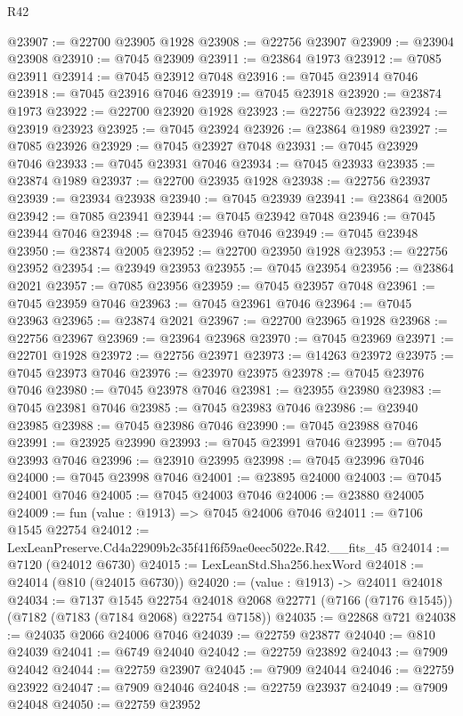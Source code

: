 \begin{lexlean}{R42}
\begin{coremodule}
{@23907 := @22700 @23905 @1928
@23908 := @22756 @23907
@23909 := @23904 @23908
@23910 := @7045 @23909
@23911 := @23864 @1973
@23912 := @7085 @23911
@23914 := @7045 @23912 @7048
@23916 := @7045 @23914 @7046
@23918 := @7045 @23916 @7046
@23919 := @7045 @23918
@23920 := @23874 @1973
@23922 := @22700 @23920 @1928
@23923 := @22756 @23922
@23924 := @23919 @23923
@23925 := @7045 @23924
@23926 := @23864 @1989
@23927 := @7085 @23926
@23929 := @7045 @23927 @7048
@23931 := @7045 @23929 @7046
@23933 := @7045 @23931 @7046
@23934 := @7045 @23933
@23935 := @23874 @1989
@23937 := @22700 @23935 @1928
@23938 := @22756 @23937
@23939 := @23934 @23938
@23940 := @7045 @23939
@23941 := @23864 @2005
@23942 := @7085 @23941
@23944 := @7045 @23942 @7048
@23946 := @7045 @23944 @7046
@23948 := @7045 @23946 @7046
@23949 := @7045 @23948
@23950 := @23874 @2005
@23952 := @22700 @23950 @1928
@23953 := @22756 @23952
@23954 := @23949 @23953
@23955 := @7045 @23954
@23956 := @23864 @2021
@23957 := @7085 @23956
@23959 := @7045 @23957 @7048
@23961 := @7045 @23959 @7046
@23963 := @7045 @23961 @7046
@23964 := @7045 @23963
@23965 := @23874 @2021
@23967 := @22700 @23965 @1928
@23968 := @22756 @23967
@23969 := @23964 @23968
@23970 := @7045 @23969
@23971 := @22701 @1928
@23972 := @22756 @23971
@23973 := @14263 @23972
@23975 := @7045 @23973 @7046
@23976 := @23970 @23975
@23978 := @7045 @23976 @7046
@23980 := @7045 @23978 @7046
@23981 := @23955 @23980
@23983 := @7045 @23981 @7046
@23985 := @7045 @23983 @7046
@23986 := @23940 @23985
@23988 := @7045 @23986 @7046
@23990 := @7045 @23988 @7046
@23991 := @23925 @23990
@23993 := @7045 @23991 @7046
@23995 := @7045 @23993 @7046
@23996 := @23910 @23995
@23998 := @7045 @23996 @7046
@24000 := @7045 @23998 @7046
@24001 := @23895 @24000
@24003 := @7045 @24001 @7046
@24005 := @7045 @24003 @7046
@24006 := @23880 @24005
@24009 := fun (value : @1913) => @7045 @24006 @7046
@24011 := @7106 @1545 @22754
@24012 := LexLeanPreserve.Cd4a22909b2c35f41f6f59ae0eec5022e.R42.__fits_45
@24014 := @7120 (@24012 @6730)
@24015 := LexLeanStd.Sha256.hexWord
@24018 := @24014 (@810 (@24015 @6730))
@24020 := (value : @1913) -> @24011 @24018
@24034 := @7137
    @1545
    @22754
    @24018
    @2068
    @22771
    (@7166 (@7176 @1545))
    (@7182 (@7183 (@7184 @2068) @22754 @7158))
@24035 := @22868 @721
@24038 := @24035 @2066 @24006 @7046
@24039 := @22759 @23877
@24040 := @810 @24039
@24041 := @6749 @24040
@24042 := @22759 @23892
@24043 := @7909 @24042
@24044 := @22759 @23907
@24045 := @7909 @24044
@24046 := @22759 @23922
@24047 := @7909 @24046
@24048 := @22759 @23937
@24049 := @7909 @24048
@24050 := @22759 @23952
}
\end{coremodule}
\end{lexlean}
